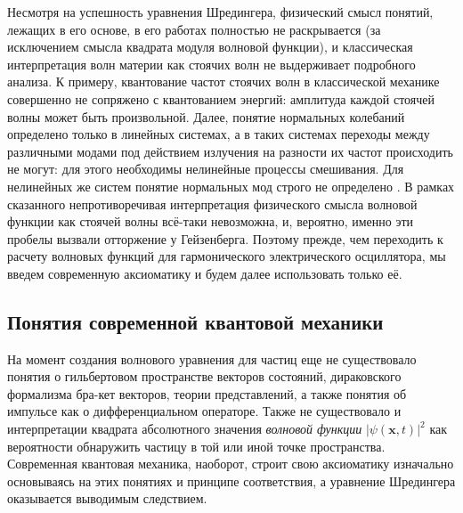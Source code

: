 \documentclass[14pt, a4paper]{extreport}
\numberwithin{equation}{section}
\begin{document}
Несмотря на успешность уравнения Шредингера, физический смысл понятий, лежащих в его основе, в его работах полностью не раскрывается (за исключением смысла квадрата модуля волновой функции), и классическая интерпретация волн материи как стоячих волн не выдерживает подробного анализа. К примеру, квантование частот стоячих волн в классической механике совершенно не сопряжено с квантованием энергий: амплитуда каждой стоячей волны может быть произвольной. Далее, понятие нормальных колебаний определено только в линейных системах, а в таких системах переходы между различными модами под действием излучения на разности их частот происходить не могут: для этого необходимы нелинейные процессы смешивания. Для нелинейных же систем понятие нормальных мод строго не определено \cite{kerschen2009nonlinear}. В рамках сказанного непротиворечивая интерпретация физического смысла волновой функции как стоячей волны всё-таки невозможна, и, вероятно, именно эти пробелы вызвали отторжение у Гейзенберга. Поэтому прежде, чем переходить к расчету волновых функций для гармонического электрического осциллятора, мы введем современную аксиоматику и будем далее использовать только её. 

\subsection{Понятия современной квантовой механики}

На момент создания волнового уравнения для частиц еще не существовало понятия о гильбертовом пространстве векторов состояний, дираковского формализма бра-кет векторов, теории представлений, а также понятия об импульсе как о дифференциальном операторе. Также не существовало и интерпретации квадрата абсолютного значения \textit{волновой функции} $|\psi(\mathbf{x},t)|^2$ как вероятности обнаружить частицу в той или иной точке пространства. Современная квантовая механика, наоборот, строит свою аксиоматику изначально основываясь на этих понятиях и принципе соответствия, а уравнение Шредингера оказывается выводимым следствием. 
\end{document}

